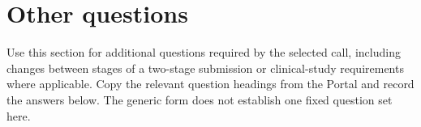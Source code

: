 \clearpage
\section{Other questions}
\begin{heguidance}
Use this section for additional questions required by the selected call, including
changes between stages of a two-stage submission or clinical-study requirements
where applicable. Copy the relevant question headings from the Portal and record
the answers below. The generic form does not establish one fixed question set here.
\end{heguidance}
